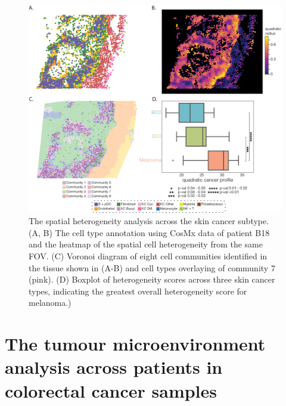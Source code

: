 \begin{figure}
    \centering
    \includegraphics[width=0.8\columnwidth]{Chapter4/Figures/Chap4_figure_2.png}
    \caption[The spatial heterogeneity analysis across the skin cancer subtype]{The spatial heterogeneity analysis across the skin cancer subtype. (A, B) The cell type annotation using CosMx data of patient B18 and the heatmap of the spatial cell heterogeneity from the same FOV. (C) Voronoi diagram of eight cell communities identified in the tissue shown in (A-B) and cell types overlaying of community 7 (pink). (D) Boxplot of heterogeneity scores across three skin cancer types, indicating the greatest overall heterogeneity score for melanoma.)}
    \label{Chap4:fig1}
    
\end{figure}



\section{The tumour microenvironment analysis across patients in colorectal cancer samples}

